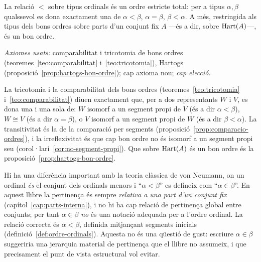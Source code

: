 \begin{proposicio}\label{prop:ordinals-total}
La relació \(<\) sobre tipus ordinals és un ordre estricte total: per a
tipus \(\alpha,\beta\) qualssevol es dona exactament una de \(\alpha<\beta\),
\(\alpha=\beta\), \(\beta<\alpha\). A més, restringida als tipus dels bons
ordres sobre parts d'un conjunt fix \(A\) ---és a dir, sobre \(\operatorname{Hart}(A)\)---,
és un bon ordre.\par
\emph{Axiomes usats:} comparabilitat i tricotomia de bons ordres
(teoremes~\ref{teo:comparabilitat} i~\ref{teo:tricotomia}), Hartogs
(proposició~\ref{prop:hartogs-bon-ordre}); cap axioma nou; \emph{cap elecció}.
\end{proposicio}

\begin{prova}
La tricotomia i la comparabilitat dels bons ordres
(teoremes~\ref{teo:tricotomia} i~\ref{teo:comparabilitat}) diuen exactament
que, per a dos representants \(W\) i \(V\), es dona una i una sola de: \(W\)
isomorf a un segment propi de \(V\) (és a dir \(\alpha<\beta\)), \(W\cong V\)
(és a dir \(\alpha=\beta\)), o \(V\) isomorf a un segment propi de \(W\) (és a
dir \(\beta<\alpha\)). La transitivitat és la de la comparació per segments
(proposició~\ref{prop:comparacio-ordres}), i la irreflexivitat és que cap bon
ordre no és isomorf a un segment propi seu
(corol·lari~\ref{cor:no-segment-propi}). Que sobre \(\operatorname{Hart}(A)\) és un bon
ordre és la proposició~\ref{prop:hartogs-bon-ordre}.
\end{prova}

\begin{observacio}\label{obs:no-pertinença-ordinal}
Hi ha una diferència important amb la teoria clàssica de von Neumann, on un
ordinal \emph{és} el conjunt dels ordinals menors i \enquote{\(\alpha<\beta\)}
es defineix com \enquote{\(\alpha\in\beta\)}. En aquest llibre la pertinença
és sempre \emph{relativa a una part d'un conjunt fix}
(capítol~\ref{cap:parts-interna}), i no hi ha cap relació de pertinença global
entre conjunts; per tant \(\alpha\in\beta\) \emph{no} és una notació adequada
per a l'ordre ordinal. La relació correcta és \(\alpha<\beta\), definida
mitjançant segments inicials (definició~\ref{def:ordre-ordinals}). Aquesta no
és una qüestió de gust: escriure \(\alpha\in\beta\) suggeriria una jerarquia
material de pertinença que el llibre no assumeix, i que precisament el punt de
vista estructural vol evitar.
\end{observacio}

